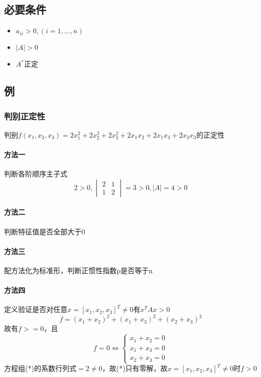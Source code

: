 \subsection{必要条件}
\begin{itemize}
    \item \(a_{ii} > 0, (i = 1, ..., n)\)
    \item \(|A| > 0\)
    \item \(A^*\)正定
\end{itemize}

\subsection{例}

\subsubsection{判别正定性}
判别\(f(x_1, x_2, x_3) = 2x_1^2 + 2x_2^2 + 2x_3^2 + 2x_1x_2 + 2x_1x_3 + 2x_2x_3\)的正定性

\paragraph{方法一}
判断各阶顺序主子式\[2 > 0, \begin{vmatrix}
    2 & 1 \\ 
    1 & 2
\end{vmatrix} = 3 > 0, |A| = 4 > 0\]

\paragraph{方法二}
判断特征值是否全部大于0

\paragraph{方法三}
配方法化为标准形，判断正惯性指数p是否等于n

\paragraph{方法四}
定义验证是否对任意\(x = [x_1, x_2, x_3]^T \neq 0\)有\(x^TAx > 0\)\[f = (x_1 + x_2)^2 + (x_1 + x_3)^2 + (x_2 + x_3)^2\]
故有\(f >= 0\)，且\[f = 0 \Leftrightarrow \begin{cases}
    x_1 + x_2 = 0 \\ 
    x_1 + x_3 = 0 \\ 
    x_2 + x_3 = 0
\end{cases}\tag{*}\]
方程组(*)的系数行列式\( = 2 \neq 0\)，故(*)只有零解，故\(x = [x_1, x_2, x_3]^T \neq 0\)时\(f > 0\)

